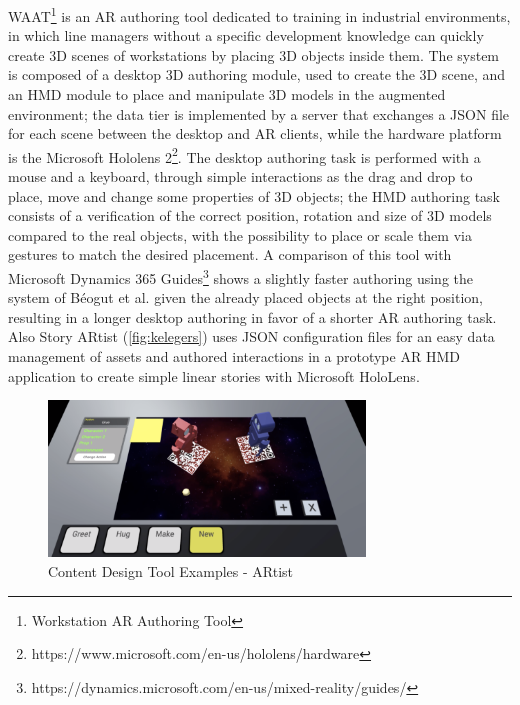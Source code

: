 WAAT\footnote{Workstation AR Authoring Tool} \cite{de_paolis_waat_2020} is an AR authoring tool dedicated to training in industrial environments, in which line managers without a specific development knowledge can quickly create 3D scenes of workstations by placing 3D objects inside them. The system is composed of a desktop 3D authoring module, used to create the 3D scene, and an \gls{HMD} module to place and manipulate 3D models in the augmented environment; the data tier is implemented by a server that exchanges a JSON file for each scene between the desktop and AR clients, while the hardware platform is the Microsoft Hololens 2\footnote{https://www.microsoft.com/en-us/hololens/hardware}. The desktop authoring task is performed with a mouse and a keyboard, through simple interactions as the drag and drop to place, move and change some properties of 3D objects; the \gls{HMD} authoring task consists of a verification of the correct position, rotation and size of 3D models compared to the real objects, with the possibility to place or scale them via gestures to match the desired placement.
A comparison of this tool with Microsoft Dynamics 365 Guides\footnote{https://dynamics.microsoft.com/en-us/mixed-reality/guides/} shows a slightly faster authoring using the system of Béogut et al. given the already placed objects at the right position, resulting in a longer desktop authoring in favor of a shorter AR authoring task.\\
Also Story ARtist \cite{kegeleers_story_2021} (\autoref{fig:kelegers}) uses JSON configuration files for an easy data management of assets and authored interactions in a prototype AR \gls{HMD} application to create simple linear stories with Microsoft HoloLens.
\begin{figure}[h]
    \centering
    \includegraphics[width=0.75\textwidth]{Figures/Background/tools/M.Kegeleers.png}
    \caption{Content Design Tool Examples - ARtist}
    \label{fig:kelegers}
\end{figure}

